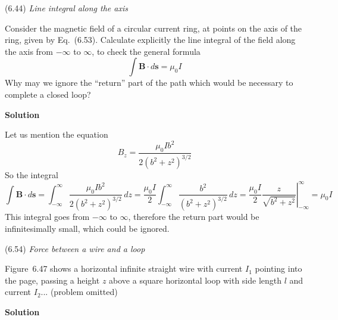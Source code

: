 \documentclass{article}
\begin{document}

\begin{homeworkProblem}
	(6.44) \textit{Line integral along the axis}

	Consider the magnetic field of a circular current ring, at points on the axis of the ring, given by Eq.~(6.53). Calculate explicitly the line integral of the field along the axis from $-\infty$ to $\infty$, to check the general formula
	\begin{equation}\tag{6.97}
		\int\mathbf{B}\cdot d\mathbf{s}=\mu_0I
	\end{equation}
	Why may we ignore the ``return'' part of the path which would be necessary to complete a closed loop?

	\textbf{Solution}

	Let us mention the equation
	\begin{equation}\tag{6.53}
		B_z=\frac{\mu_0Ib^2}{2(b^2+z^2)^{3/2}}
	\end{equation}
	So the integral
	\[
		\int\mathbf{B}\cdot d\mathbf{s}=\int_{-\infty}^{\infty}\frac{\mu_0Ib^2}{2(b^2+z^2)^{3/2}}\,dz=\frac{\mu_0I}{2}\int_{-\infty}^{\infty}\frac{b^2}{(b^2+z^2)^{3/2}}\,dz=\left.\frac{\mu_0I}{2}\frac{z}{\sqrt{b^2+z^2}}\right|_{-\infty}^{\infty}=\mu_0I
	\]
	This integral goes from $-\infty$ to $\infty$, therefore the return part would be infinitesimally small, which could be ignored.
\end{homeworkProblem}


\begin{homeworkProblem}
	(6.54) \textit{Force between a wire and a loop}
	
	Figure~6.47 shows a horizontal infinite straight wire with current $I_1$ pointing into the page, passing a height $z$ above a square horizontal loop with side length $l$ and current $I_2$... (problem omitted)

	\textbf{Solution}

	\begin{figure}[H]
		\centering
	\end{figure}
\end{homeworkProblem}
\end{document}
